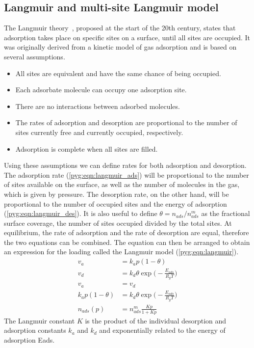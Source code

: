 \subsection{Langmuir and multi-site Langmuir
	model}\label{pyg:models:langmuir}

The Langmuir theory~\cite{langmuirAdsorptionGasesPlane1918},
proposed at the start of the 20th century, states that
adsorption takes place on specific sites on a surface, until
all sites are occupied.
It was originally derived from a kinetic model of gas adsorption and
is based on several assumptions.

\begin{itemize}

	\item All sites are equivalent and have the same chance of
	      being occupied.
	\item Each adsorbate molecule can occupy one adsorption site.
	\item There are no interactions between adsorbed molecules.
	\item The rates of adsorption and desorption are proportional
	      to the number of sites currently free and currently occupied,
	      respectively.
	\item Adsorption is complete when all sites are filled.

\end{itemize}

Using these assumptions we can define rates for both adsorption and
desorption. The adsorption rate (\autoref{pyg:eqn:langmuir_ads})
will be proportional to the number of sites available on the surface,
as well as the number of molecules in the gas, which is given by
pressure.
The desorption rate, on the other hand, will be proportional to the
number of occupied sites and the energy of adsorption
(\autoref{pyg:eqn:langmuir_des}).
It is also useful to define \(\theta = n_{ads}/n_{ads}^m\) as the fractional
surface coverage, the number of sites occupied divided by the total 
sites. At equilibrium, the rate of adsorption and the rate of
desorption are equal, therefore the two equations can be combined.
The equation can then be arranged to obtain an expression for the
loading called the Langmuir model (\autoref{pyg:eqn:langmuir}).
%
\begin{align}
	v_a                & = k_a p (1 - \theta) \label{pyg:eqn:langmuir_ads} \\
	v_d                & = k_d \theta \exp{\Big(-\frac{E_{ads}}{R_gT}\Big)}
	\label{pyg:eqn:langmuir_des}                                           \\
	v_a                & = v_d                                             \\
	k_a p (1 - \theta) & = k_d \theta \exp{\Big(-\frac{E_{ads}}{R_gT}\Big)}  \\
	n_{ads}(p)             & = n_{ads}^m \frac{Kp}{1+Kp} \label{pyg:eqn:langmuir}
\end{align}
%
The Langmuir constant \(K\) is the product of the individual
desorption and adsorption constants \(k_a\) and \(k_d\) and exponentially
related to the energy of adsorption \gls{Eads}.

